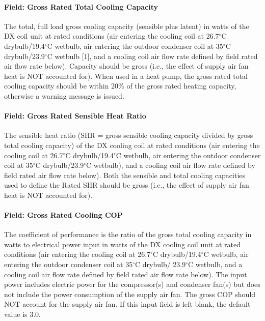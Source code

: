 \paragraph{Field: Gross Rated Total Cooling Capacity}\label{field-gross-rated-total-cooling-capacity-1}

The total, full load gross cooling capacity (sensible plus latent) in watts of the DX coil unit at rated conditions (air entering the cooling coil at 26.7$^\circ$C drybulb/19.4$^\circ$C wetbulb, air entering the outdoor condenser coil at 35$^\circ$C drybulb/23.9$^\circ$C wetbulb {[}1{]}, and a cooling coil air flow rate defined by field rated air flow rate below). Capacity should be gross (i.e., the effect of supply air fan heat is NOT accounted for). When used in a heat pump, the gross rated total cooling capacity should be within 20\% of the gross rated heating capacity, otherwise a warning message is issued.

\paragraph{Field: Gross Rated Sensible Heat Ratio}\label{field-gross-rated-sensible-heat-ratio}

The sensible heat ratio (SHR = gross sensible cooling capacity divided by gross total cooling capacity) of the DX cooling coil at rated conditions (air entering the cooling coil at 26.7$^\circ$C drybulb/19.4$^\circ$C wetbulb, air entering the outdoor condenser coil at 35$^\circ$C drybulb/23.9$^\circ$C wetbulb), and a cooling coil air flow rate defined by field rated air flow rate below). Both the sensible and total cooling capacities used to define the Rated SHR should be gross (i.e., the effect of supply air fan heat is NOT accounted for).

\paragraph{Field: Gross Rated Cooling COP}\label{field-gross-rated-cooling-cop}

The coefficient of performance is the ratio of the gross total cooling capacity in watts to electrical power input in watts of the DX cooling coil unit at rated conditions (air entering the cooling coil at 26.7$^\circ$C drybulb/19.4$^\circ$C wetbulb, air entering the outdoor condenser coil at 35$^\circ$C drybulb/ 23.9$^\circ$C wetbulb, and a cooling coil air flow rate defined by field rated air flow rate below). The input power includes electric power for the compressor(s) and condenser fan(s) but does not include the power consumption of the supply air fan. The gross COP should NOT account for the supply air fan. If this input field is left blank, the default value is 3.0.

